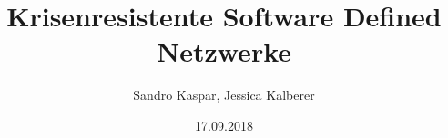 \documentclass[12pt,titlepage]{article}
\title{Krisenresistente Software Defined Netzwerke}
\author{Sandro Kaspar, Jessica Kalberer}
\date{17.09.2018}
\begin{document}




\newpage
\renewcommand{\contentsname}{Inhaltsverzeichnis}
\tableofcontents
\newpage
{}


%

%



%
%
%
%
%
%


\newpage
\appendix
{}

%
%

%
%
%

%

\end{document}
